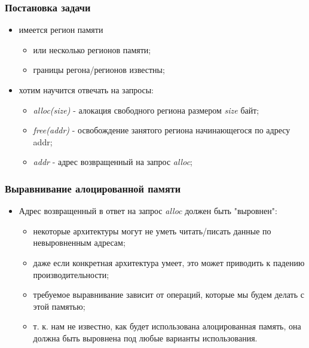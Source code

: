 \begin{frame}
\frametitle{Постановка задачи}
\begin{itemize}
  \item имеется регион памяти
  \begin{itemize}
    \item или несколько регионов памяти;
    \item границы регона/регионов известны;
  \end{itemize}
  \item хотим научится отвечать на запросы:
  \begin{itemize}
    \item \emph{alloc(size)} - алокация свободного региона размером \emph{size}
    байт;
    \item \emph{free(addr)} - освобождение занятого региона начинающегося по
    адресу addr;
    \item \emph{addr} - адрес возвращенный на запрос \emph{alloc};
  \end{itemize}
\end{itemize}
\end{frame}

\begin{frame}
\frametitle{Выравнивание алоцированной памяти}
\begin{itemize}
  \item Адрес возвращенный в ответ на запрос \emph{alloc} должен быть
  "выровнен":
  \begin{itemize}
    \item некоторые архитектуры могут не уметь читать/писать данные по
    невыровненным адресам;
    \item даже если конкретная архитектура умеет, это может приводить к падению
    производительности;
    \item требуемое выравнивание зависит от операций, которые мы будем делать с
    этой памятью;
    \item т. к. нам не известно, как будет использована алоцированная память,
    она должна быть выровнена под любые варианты использования.
  \end{itemize}
\end{itemize}
\end{frame}

